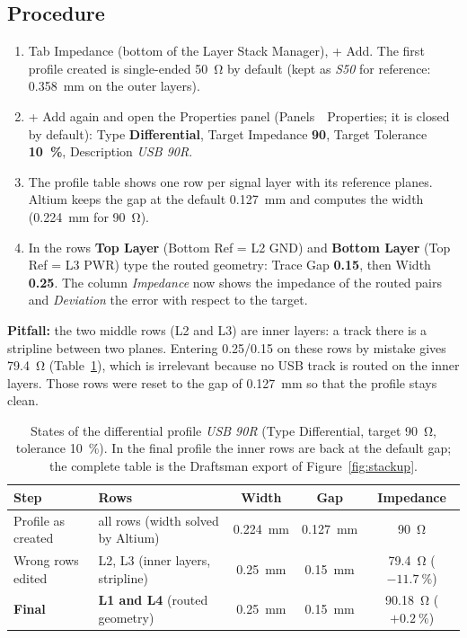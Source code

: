 \documentclass[11pt,a4paper]{article}
\newcommand{\gui}[1]{\textsf{#1}}
\newcommand{\m}{\,\guillemotright\ }
\begin{document}
\subsection{Procedure}

\begin{enumerate}
    \item Tab \gui{Impedance} (bottom of the Layer Stack Manager), \gui{+ Add}. The first profile created is
    single-ended \qty{50}{\ohm} by default (kept as \textit{S50} for reference: \qty{0.358}{mm} on the outer layers).
    \item \gui{+ Add} again and open the \gui{Properties} panel (\gui{Panels \m Properties}; it is closed by default):
    Type \textbf{Differential}, Target Impedance \textbf{90}, Target Tolerance \textbf{\qty{10}{\percent}}, Description \textit{USB 90R}.
    \item The profile table shows one row per signal layer with its reference planes. Altium keeps
    the gap at the default \qty{0.127}{mm} and computes the width (\qty{0.224}{mm} for \qty{90}{\ohm}).
    \item In the rows \textbf{Top Layer} (Bottom Ref = L2 GND) and \textbf{Bottom Layer} (Top Ref = L3 PWR)
    type the routed geometry: Trace Gap \textbf{0.15}, then Width \textbf{0.25}. The column \textit{Impedance} now
    shows the impedance of the routed pairs and \textit{Deviation} the error with respect to the target.
\end{enumerate}

\noindent\textbf{Pitfall:} the two middle rows (L2 and L3) are inner layers: a track there is a stripline between two
planes. Entering 0.25/0.15 on these rows by mistake gives \qty{79.4}{\ohm} (Table~\ref{tab:profile}), which is irrelevant
because no USB track is routed on the inner layers. Those rows were reset to the gap of \qty{0.127}{mm}
so that the profile stays clean.

\begin{table}[H]
\centering
\begin{tabular}{l>{\raggedright\arraybackslash}p{}ccc}
\toprule
Step & Rows & Width & Gap & Impedance \\
\midrule
Profile as created & all rows (width solved by Altium) & \qty{0.224}{mm} & \qty{0.127}{mm} & \qty{90}{\ohm} \\
Wrong rows edited & L2, L3 (inner layers, stripline) & \qty{0.25}{mm} & \qty{0.15}{mm} & \qty{79.4}{\ohm} ($-\qty{11.7}{\percent}$) \\
\textbf{Final} & \textbf{L1 and L4} (routed geometry) & \qty{0.25}{mm} & \qty{0.15}{mm} & \qty{90.18}{\ohm} ($+\qty{0.2}{\percent}$) \\
\bottomrule
\end{tabular}
\caption{States of the differential profile \textit{USB 90R} (Type Differential, target \qty{90}{\ohm}, tolerance
\qty{10}{\percent}). In the final profile the inner rows are back at the default gap; the complete table is the
Draftsman export of Figure~\ref{fig:stackup}.}
\label{tab:profile}
\end{table}
\end{document}
